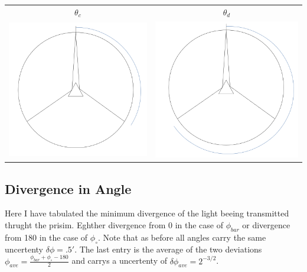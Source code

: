 \documentclass[12pt,a4paper]{article}
\begin{document}
\begin{tabular}{c c}
$\theta_c$ & $\theta_d$\\
\includegraphics[scale=.15]{a3} & \includegraphics[scale=.15]{a4}

\end{tabular}
\subsection{Divergence in Angle}
Here I have tabulated the minimum divergence of the light beeing transmitted thrught the prisim.  Eghther divergence from 0 in the case of $\phi_{bar}$ or divergence from 180 in the case of $\phi_\circ$.  Note that as before all angles carry the same uncertenty $\delta\phi=.5'$.  The last entry is the average of the two deviations $\phi_{ave}=\frac{\phi_{bar}+\phi_{\circ}-180}{2}$ and carrys a uncertenty of $\delta\phi_{ave}=2^{-3/2}$.
\end{document}
